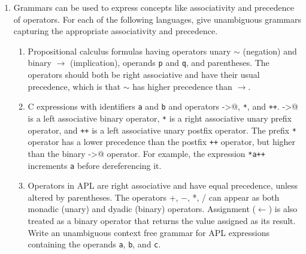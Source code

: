 \documentclass[11pt]{article}
\begin{document}

  \vspace{-3mm}

  \begin{enumerate}

    \addtolength{\itemsep}{5mm}

    \item Grammars can be used to express concepts like associativity and
          precedence of operators.  For each of the following languages,
          give unambiguous grammars capturing the appropriate associativity
          and precedence.

          \vspace{-2mm}

          \begin{enumerate}

            \addtolength{\itemsep}{3mm}

            \item Propositional calculus formulas having operators unary
                  $\sim$ (negation) and binary $\rightarrow$ (implication),
                  operands \texttt{p} and \texttt{q}, and parentheses.  The
                  operators should both be right associative and have their
                  usual precedence, which is that $\sim$ has higher
                  precedence than $\rightarrow$.

            \item C expressions with identifiers \texttt{a} and \texttt{b}
                  and operators \verb@->@, \texttt{*}, and \texttt{++}.
                  \verb@->@ is a left associative binary operator,
                  \texttt{*} is a right associative unary prefix operator,
                  and \texttt{++} is a left associative unary postfix
                  operator.  The prefix \texttt{*} operator has a lower
                  precedence than the postfix \texttt{++} operator, but
                  higher than the binary \verb@->@ operator.  For example,
                  the expression \texttt{*a++} increments \texttt{a} before
                  dereferencing it.

            \item Operators in APL are right associative and have equal
                  precedence, unless altered by parentheses.  The operators
                  +, $-$, *, / can appear as both monadic (unary) and dyadic
                  (binary) operators.  Assignment ($\leftarrow$) is also
                  treated as a binary operator that returns the value
                  assigned as its result.  Write an unambiguous context free
                  grammar for APL expressions containing the operands
                  \texttt{a}, \texttt{b}, and \texttt{c}.


\end{enumerate}
\end{enumerate}
\end{document}
